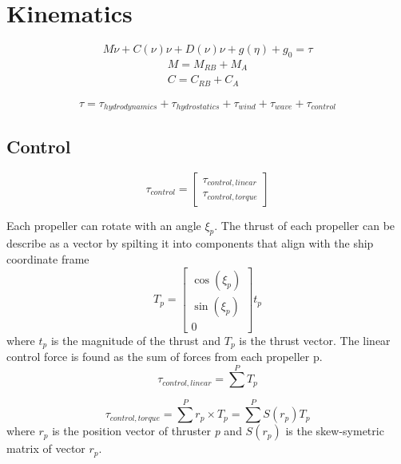 \documentclass[12pt,a4]{article}
\begin{document}
\section{Kinematics}
\begin{equation}
	M \dot{\nu} + C(\nu)\nu + D(\nu)\nu + g(\eta) + g_0 = \tau
\end{equation}
\begin{align*}
	M  = M_{RB} + M_A \\
	C  = C_{RB} + C_A
\end{align*}

\begin{equation}
	\tau = \tau_{hydrodynamics}+\tau_{hydrostatics}+\tau_{wind}+\tau_{wave}+\tau_{control}
\end{equation}


\subsection{Control}
\begin{equation}
	\tau_{control} = \begin{bmatrix}
		\tau_{control,linear} \\
		\tau_{control,torque}
	\end{bmatrix}
\end{equation}

Each propeller can rotate with an angle $\xi_p$. The thrust of each propeller can be describe as a vector by spilting it into components that align with the ship coordinate frame
\begin{equation}
	T_p = \begin{bmatrix} \cos(\xi_p)\\ \sin(\xi_p)\\ 0 \end{bmatrix} t_p
\end{equation}
where $t_p$ is the magnitude of the thrust and $T_p$ is the thrust vector.
The linear control force is found as the sum of forces from each propeller p.
\begin{equation}
	\tau_{control,linear} = \sum^P T_p
\end{equation}

\begin{equation}
	\tau_{control,torque} = \sum^P  r_p \times T_p = \sum^P S(r_p) T_p
\end{equation}
where $r_p$ is the position vector of thruster \textit{p} and $S(r_p)$ is the skew-symetric matrix of vector $r_p$.
\end{document}
